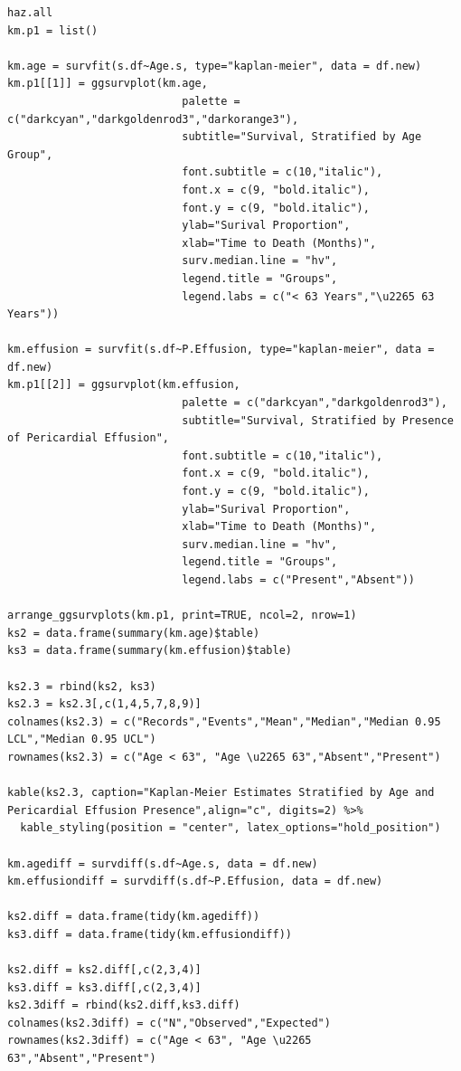 \documentclass[
]{article}
\begin{document}
\begin{verbatim}
haz.all
km.p1 = list()

km.age = survfit(s.df~Age.s, type="kaplan-meier", data = df.new)
km.p1[[1]] = ggsurvplot(km.age, 
                           palette = c("darkcyan","darkgoldenrod3","darkorange3"), 
                           subtitle="Survival, Stratified by Age Group",
                           font.subtitle = c(10,"italic"),
                           font.x = c(9, "bold.italic"),
                           font.y = c(9, "bold.italic"),
                           ylab="Surival Proportion", 
                           xlab="Time to Death (Months)",
                           surv.median.line = "hv",
                           legend.title = "Groups",
                           legend.labs = c("< 63 Years","\u2265 63 Years"))

km.effusion = survfit(s.df~P.Effusion, type="kaplan-meier", data = df.new)
km.p1[[2]] = ggsurvplot(km.effusion, 
                           palette = c("darkcyan","darkgoldenrod3"), 
                           subtitle="Survival, Stratified by Presence of Pericardial Effusion",
                           font.subtitle = c(10,"italic"),
                           font.x = c(9, "bold.italic"),
                           font.y = c(9, "bold.italic"),
                           ylab="Surival Proportion", 
                           xlab="Time to Death (Months)",
                           surv.median.line = "hv",
                           legend.title = "Groups",
                           legend.labs = c("Present","Absent"))

arrange_ggsurvplots(km.p1, print=TRUE, ncol=2, nrow=1)
ks2 = data.frame(summary(km.age)$table)
ks3 = data.frame(summary(km.effusion)$table)

ks2.3 = rbind(ks2, ks3)
ks2.3 = ks2.3[,c(1,4,5,7,8,9)]
colnames(ks2.3) = c("Records","Events","Mean","Median","Median 0.95 LCL","Median 0.95 UCL")
rownames(ks2.3) = c("Age < 63", "Age \u2265 63","Absent","Present")

kable(ks2.3, caption="Kaplan-Meier Estimates Stratified by Age and Pericardial Effusion Presence",align="c", digits=2) %>%
  kable_styling(position = "center", latex_options="hold_position")

km.agediff = survdiff(s.df~Age.s, data = df.new)
km.effusiondiff = survdiff(s.df~P.Effusion, data = df.new)

ks2.diff = data.frame(tidy(km.agediff))
ks3.diff = data.frame(tidy(km.effusiondiff))

ks2.diff = ks2.diff[,c(2,3,4)]
ks3.diff = ks3.diff[,c(2,3,4)]
ks2.3diff = rbind(ks2.diff,ks3.diff)
colnames(ks2.3diff) = c("N","Observed","Expected")
rownames(ks2.3diff) = c("Age < 63", "Age \u2265 63","Absent","Present")


\end{verbatim}
\end{document}
